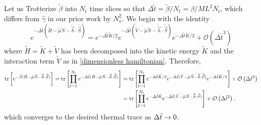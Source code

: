 Let us Trotterize $\tilde{\beta}$ into $N_t$ time slices so that $\Delta \tilde{t} = \tilde{\beta}/N_t = \beta/M L^2 N_t$, which differs from $\hat{\gamma}$ in our prior work by $N_x^2$.
We begin with the identity
\begin{equation}
	e^{-\Delta \tilde{t}(\tilde{H} - \tilde{\mu}\tilde{N} - \tilde{\vec{h}}\cdot\tilde{\vec{S}})}
	=
	e^{-\Delta \tilde{t}\tilde{K} / 2}
	e^{-\Delta \tilde{t} (\tilde{V} - \tilde{\mu} \tilde{N} - \tilde{\vec{h}}\cdot \tilde{\vec{S}})}
	e^{-\Delta \tilde{t}\tilde{K} / 2}
	+
	\mathcal{O}(\Delta \tilde{t}^3) 
\end{equation}
where $\tilde{H} = \tilde{K} + \tilde{V}$ has been decomposed into the kinetic energy $\tilde{K}$ and the interaction term $\tilde{V}$ as in \eqref{dimensionless hamiltonian}.
Therefore,
\begin{align}
	\text{tr}\left[e^{-\tilde{\beta}(\tilde{H}-\tilde{\mu} \tilde{N} - \tilde{\vec{h}}\cdot \tilde{\vec{S}})}\right]
	=
	\text{tr}\left[
		\prod_{t=1}^{N_t}
		e^{-\Delta \tilde{t} (\tilde{H}-\tilde{\mu}\tilde{N} - \tilde{\vec{h}}\cdot \tilde{\vec{S}})}
	\right]
	&=
	\text{tr}\left[
		\prod_{t=1}^{N_t}
		e^{-\Delta \tilde{t}\tilde{K} / 2}
		e^{-\Delta \tilde{t} (\tilde{V} - \tilde{\mu} \tilde{N} - \tilde{\vec{h}}\cdot \tilde{\vec{S}})}
		e^{-\Delta \tilde{t}\tilde{K} / 2}
	\right]
	+ \mathcal{O}\left(\Delta \tilde{t}^2\right)
	\nonumber\\
	&=
	\text{tr}\left[
		\prod_{t=1}^{N_t}
		e^{-\Delta \tilde{t}\tilde{K}}
		e^{-\Delta \tilde{t} (\tilde{V} - \tilde{\mu} \tilde{N} - \tilde{\vec{h}}\cdot \tilde{\vec{S}})}
	\right]
	+ \mathcal{O}\left(\Delta \tilde{t}^2\right).
	\label{eq:trotterization}
\end{align}
which converges to the desired thermal trace as $\Delta \tilde{t} \rightarrow 0$.


